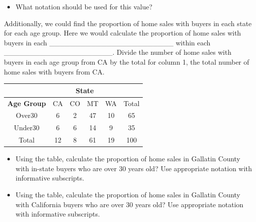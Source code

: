 \documentclass[
]{report}
\providecommand{\tightlist}{%
  \setlength{\itemsep}{0pt}\setlength{\parskip}{0pt}}
\begin{document}
\begin{itemize}
\tightlist
\item
  What notation should be used for this value?
\end{itemize}

\vspace{0.2in}


Additionally, we could find the proportion of home sales with buyers in each state for each age group. Here we would calculate the proportion of home sales with buyers in each \_\_\_\_\_\_\_\_\_\_\_\_\_\_\_\_\_\_\_\_\_\_\_\_ within each \_\_\_\_\_\_\_\_\_\_\_\_\_\_\_\_\_\_\_\_\_. Divide the number of home sales with buyers in each age group from CA by the total for column 1, the total number of home sales with buyers from CA.


\begin{center}
\begingroup
\setlength{\tabcolsep}{14pt} %
\renewcommand{\arraystretch}{2} %
\begin{tabular}{|c|c|c|c|c|c|}
\hline
 & \multicolumn{4}{|c|}{\textbf{State}} & \\ \hline
\textbf{Age Group} & CA & CO & MT & WA & Total \\ \hline
 Over30 & 6 & 2 & 47 & 10 & 65 \\ \hline
 Under30 & 6 & 6 & 14 & 9 & 35 \\ \hline
 Total & 12 & 8 & 61 & 19 & 100\\ \hline  
\end{tabular}
\endgroup
\end{center}

\begin{itemize}
\tightlist
\item
  Using the table, calculate the proportion of home sales in Gallatin County with in-state buyers who are over 30 years old? Use appropriate notation with informative subscripts.
\end{itemize}

\vspace{0.4in}

\begin{itemize}
\tightlist
\item
  Using the table, calculate the proportion of home sales in Gallatin County with California buyers who are over 30 years old? Use appropriate notation with informative subscripts.
\end{itemize}
\end{document}

